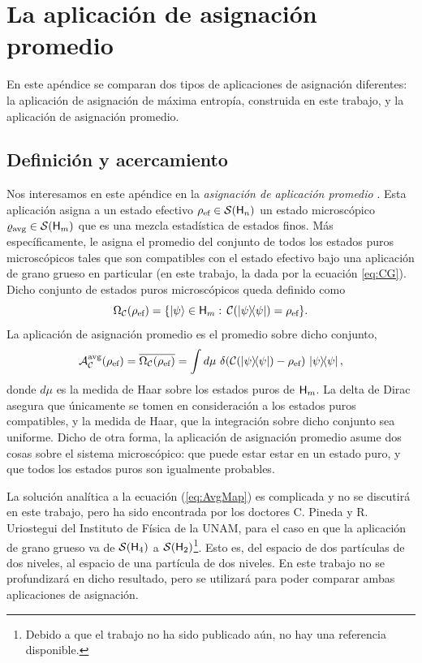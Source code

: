 \chapter{La aplicación de asignación promedio}\label{ch:5}

En este apéndice se comparan dos tipos de aplicaciones de asignación diferentes: la aplicación de asignación de máxima entropía, construida en este trabajo, y la aplicación de asignación promedio.

\section{Definición y acercamiento}




Nos interesamos en este apéndice en la \textit{asignación de aplicación promedio} \cite{Macro-To-Micro}. Esta aplicación asigna a un estado efectivo $\rho_{\text{ef}} \in \mathcal{S}({\sf H}_{n})$ un estado microscópico $\varrho_{\text{avg}} \in \mathcal{S}({\sf H}_{m})$ que es una mezcla estadística de estados finos. Más específicamente, le asigna el promedio del conjunto de todos los estados puros microscópicos tales que son compatibles con el estado efectivo bajo una aplicación de grano grueso en particular (en este trabajo, la dada por la ecuación \ref{eq:CG}). Dicho conjunto de estados puros microscópicos queda definido como
\begin{equation}\label{eq:Omega}
    \Omega_{\mcC}(\rho_{\ef}) = \{\ket{\psi}\in\hilbert_{m}:\, \mcC(\dyad{\psi}) = \rho_{\ef}  \}.
\end{equation}
La aplicación de asignación promedio es el promedio sobre dicho conjunto, \ie 
\begin{equation}\label{eq:AvgMap}
    \mcA_{\mcC}^{\avg}(\rho_{\ef}) = \overline{\Omega_{\mcC}(\rho_{\ef})} = \int d \mu\,\, \delta(\mcC(\dyad{\psi})-\rho_{\ef})\,\dyad{\psi},
\end{equation}
donde $d\mu$ es la medida de Haar sobre los estados puros de ${\sf H}_{m}$. La delta de Dirac asegura que únicamente se tomen en consideración a los estados puros compatibles, y la medida de Haar, que la integración sobre dicho conjunto sea uniforme. Dicho de otra forma, la aplicación de asignación promedio asume dos cosas sobre el sistema microscópico: que puede estar estar en un estado puro, y que todos los estados puros son igualmente probables.

La solución analítica a la ecuación (\ref{eq:AvgMap}) es complicada y no se discutirá en este trabajo, pero ha sido encontrada por los doctores C. Pineda y R. Uriostegui del Instituto de Física de la UNAM, para el caso en que la aplicación de grano grueso va de $\mathcal{S}({\sf H}_{4})$ a $\mathcal{S}({\sf H}_{2})$\footnote{Debido a que el trabajo no ha sido publicado aún, no hay una referencia disponible.}. Esto es, del espacio de dos partículas de dos niveles, al espacio de una partícula de dos niveles. En este trabajo no se profundizará en dicho resultado, pero se utilizará para poder comparar ambas aplicaciones de asignación.

